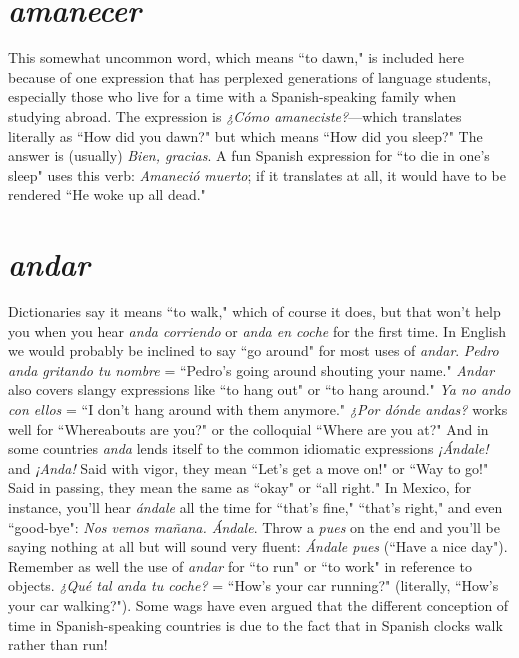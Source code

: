 \section{\emph{amanecer}}

This somewhat uncommon word, which means ``to dawn," is
included here because of one expression that has perplexed generations
of language students, especially those who live for a time with a
Spanish-speaking family when studying abroad. The expression is
\emph{¿Cómo amaneciste?}---which translates literally as ``How did you
dawn?" but which means ``How did you sleep?" The answer is (usually) \emph{Bien, gracias}. A fun Spanish expression for ``to die in one's sleep"
uses this verb: \emph{Amaneció muerto}; if it translates at all, it would have
to be rendered ``He woke up all dead."

\section{\emph{andar}}

Dictionaries say it means ``to walk," which of course it does,
but that won't help you when you hear \emph{anda corriendo} or \emph{anda en
	coche} for the first time. In English we would probably be inclined
to say ``go around" for most uses of \emph{andar}. \emph{Pedro anda gritando tu
	nombre} = ``Pedro's going around shouting your name." \emph{Andar} also
covers slangy expressions like ``to hang out" or ``to hang around." \emph{Ya
	no ando con ellos} = ``I don't hang around with them anymore." \emph{¿Por
	dónde andas?} works well for ``Whereabouts are you?" or the colloquial
``Where are you at?" And in some countries \emph{anda} lends itself to the
common idiomatic expressions \emph{¡Ándale!} and \emph{¡Anda!} Said with vigor,
they mean ``Let's get a move on!" or ``Way to go!" Said in passing, they
mean the same as ``okay" or ``all right." In Mexico, for instance, you'll
hear \emph{ándale} all the time for ``that's fine," ``that's right," and even
``good-bye": \emph{Nos vemos mañana. Ándale}. Throw a \emph{pues} on the end
and you'll be saying nothing at all but will sound very fluent: \emph{Ándale
	pues} (``Have a nice day"). Remember as well the use of \emph{andar} for ``to
run" or ``to work" in reference to objects. \emph{¿Qué tal anda tu coche?} =
``How's your car running?" (literally, ``How's your car walking?").
Some wags have even argued that the different conception of time in
Spanish-speaking countries is due to the fact that in Spanish clocks
walk rather than run!

